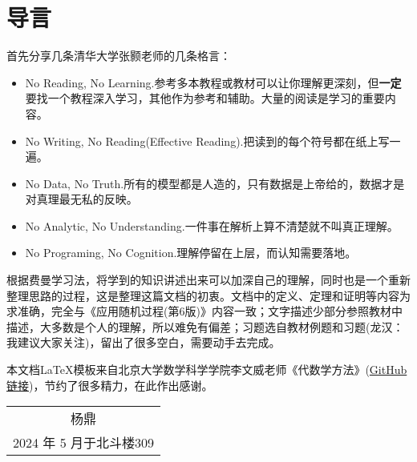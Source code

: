 
\chapter*{导言}	%

首先分享几条清华大学张颢老师的几条格言：
\begin{itemize}
	\item No Reading, No Learning.参考多本教程或教材可以让你理解更深刻，但\textbf{一定}要找一个教程深入学习，其他作为参考和辅助。大量的阅读是学习的重要内容。
	\item No Writing, No Reading(Effective Reading).把读到的每个符号都在纸上写一遍。
	\item No Data, No Truth.所有的模型都是人造的，只有数据是上帝给的，数据才是对真理最无私的反映。
	\item No Analytic, No Understanding.一件事在解析上算不清楚就不叫真正理解。
	\item No Programing, No Cognition.理解停留在上层，而认知需要落地。
\end{itemize}

根据费曼学习法，将学到的知识讲述出来可以加深自己的理解，同时也是一个重新整理思路的过程，这是整理这篇文档的初衷。文档中的定义、定理和证明等内容为求准确，完全与《应用随机过程(第6版)》内容一致；文字描述少部分参照教材中描述，大多数是个人的理解，所以难免有偏差；习题选自教材例题和习题(龙汉：我建议大家关注)，留出了很多空白，需要动手去完成。

本文档\LaTeX 模板来自北京大学数学科学学院李文威老师《代数学方法》(\href{https://github.com/wenweili/AlJabr-1}{GitHub链接})，节约了很多精力，在此作出感谢。 \nopagebreak

\vspace{1em}
\begin{flushright}\begin{minipage}{0.3 \textwidth}
		\begin{tabular}{c}
			{\kaishu 杨鼎} \\
			2024 年 5 月于北斗楼309
		\end{tabular}
	\end{minipage}\end{flushright}
\vspace{1em}

